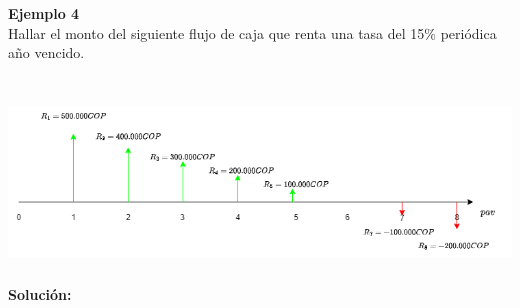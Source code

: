 \textbf{Ejemplo 4}\\
	Hallar el monto del siguiente flujo de caja que renta una tasa del 15\% periódica año vencido. \\
	\\
	\begin{center}
		\includegraphics[height=4.5cm]{6_Capitulo/img/ejemplos/6_6}
	\end{center}
	
	\textbf{Solución:}
	
